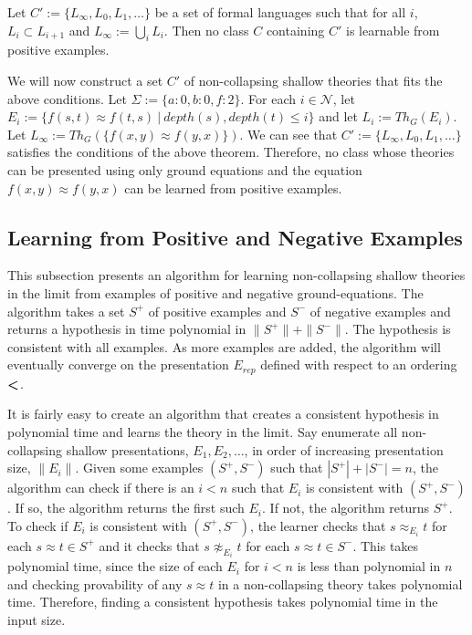 \begin{theorem}
Let $C' := \{L_{\infty}, L_0, L_1, \dots \}$ be a set of formal languages such that for all $i$, $L_i \subset L_{i+1}$ and $L_\infty := \bigcup_i L_i$. 
Then no class $C$ containing $C'$ is learnable from positive examples.
\end{theorem}



We will now construct a set $C'$ of non-collapsing shallow theories that fits the above conditions.
Let $\Sigma := \{a:0, b:0, f:2\}$. 
For each $i \in \mathcal{N}$, let $E_i := \{ f(s,t) \approx f(t,s) \ | \ depth(s),depth(t) \le i\}$ and let $L_i := Th_G(E_i)$. %
Let $L_\infty := Th_G(\{f(x,y) \approx f(y,x)\})$. 
We can see that $C' := \{L_\infty, L_0, L_1, \dots \}$ satisfies the conditions of the above theorem.
Therefore, no class whose theories can be presented using only ground equations and the equation $f(x,y) \approx f(y,x)$ can be learned from positive examples.


\subsection{Learning from Positive and Negative Examples}

This subsection presents an algorithm for learning non-collapsing shallow theories in the limit from examples of positive and negative ground-equations. 
The algorithm takes a set $S^+$ of positive examples and $S^-$ of negative examples and returns a hypothesis in time polynomial in $\|S^+\| + \|S^-\|$.
The hypothesis is consistent with all examples. 
As more examples are added, the algorithm will eventually converge on the presentation $E_{rep}$ defined with respect to an ordering $\textbf{\textless}$.

It is fairly easy to create an algorithm that creates a consistent hypothesis in polynomial time and learns the theory in the limit. 
Say enumerate all non-collapsing shallow presentations, $E_1, E_2, \dots$, in order of increasing presentation size, $\|E_i\|$.  
Given some examples $(S^+, S^-)$ such that $|S^+| + |S^-| = n$, the algorithm can check if there is an $i < n$ such that $E_i$ is consistent with $(S^+, S^-)$.
If so, the algorithm returns the first such $E_i$. 
If not, the algorithm returns $S^+$. 
To check if $E_i$ is consistent with $(S^+, S^-)$, the learner checks that $s \approx_{E_i} t$ for each $s \approx t \in S^+$ and it checks that $s \not\approx_{E_i} t$ for each $s \approx t \in S^-$. 
This takes polynomial time, since the size of each $E_i$ for $i < n$ is less than polynomial in $n$ and checking provability of any $s \approx t$ in a non-collapsing theory takes polynomial time. 
Therefore, finding a consistent hypothesis takes polynomial time in the input size. 

